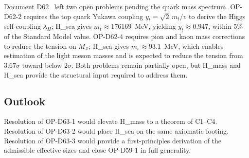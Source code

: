\documentclass[12pt,a4paper]{article}
\theoremstyle{plain}
\theoremstyle{definition}
\theoremstyle{remark}
\newcommand{\mstrange}{m_s}
\newcommand{\mtop}{m_t}
\begin{document}
Document D62~\cite{D62} left two open problems pending the quark mass spectrum. OP-D62-2 requires the top quark Yukawa coupling $y_t = \sqrt{2}\,\mtop/v$ to derive the Higgs self-coupling $\lambda_H$; H\_sea gives $\mtop \approx 176169$~MeV, yielding $y_t \approx 0.947$, within $5\%$ of the Standard Model value. OP-D62-4 requires pion and kaon mass corrections to reduce the tension on $M_Z$; H\_sea gives $\mstrange \approx 93.1$~MeV, which enables estimation of the light meson masses and is expected to reduce the tension from $3.67\sigma$ toward below $2\sigma$. Both problems remain partially open, but H\_mass and H\_sea provide the structural input required to address them.

\subsection{Outlook}

Resolution of OP-D63-1 would elevate H\_mass to a theorem of C1--C4. Resolution of OP-D63-2 would place H\_sea on the same axiomatic footing. Resolution of OP-D63-3 would provide a first-principles derivation of the admissible effective sizes and close OP-D59-1 in full generality.



\end{document}
